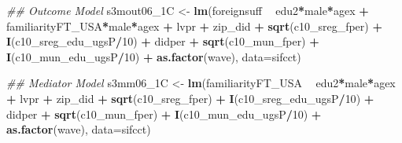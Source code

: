 \documentclass[
]{article}
\newenvironment{Shaded}{\begin{snugshade}}{\end{snugshade}}
\newcommand{\CommentTok}[1]{\textcolor[rgb]{0.56,0.35,0.01}{\textit{#1}}}
\newcommand{\DataTypeTok}[1]{\textcolor[rgb]{0.13,0.29,0.53}{#1}}
\newcommand{\DecValTok}[1]{\textcolor[rgb]{0.00,0.00,0.81}{#1}}
\newcommand{\KeywordTok}[1]{\textcolor[rgb]{0.13,0.29,0.53}{\textbf{#1}}}
\newcommand{\NormalTok}[1]{#1}
\newcommand{\OperatorTok}[1]{\textcolor[rgb]{0.81,0.36,0.00}{\textbf{#1}}}
\newcommand{\StringTok}[1]{\textcolor[rgb]{0.31,0.60,0.02}{#1}}
\begin{document}
\begin{Shaded}
\begin{Highlighting}[]
\CommentTok{## Outcome Model }
\NormalTok{s3mout06_1C <-}\StringTok{ }\KeywordTok{lm}\NormalTok{(foreignsuff  }\OperatorTok{~}\StringTok{ }\NormalTok{edu2}\OperatorTok{*}\NormalTok{male}\OperatorTok{*}\NormalTok{agex }\OperatorTok{+}\StringTok{ }\NormalTok{familiarityFT_USA}\OperatorTok{*}\NormalTok{male}\OperatorTok{*}\NormalTok{agex }\OperatorTok{+}\StringTok{ }\NormalTok{lvpr }\OperatorTok{+}\StringTok{  }
\StringTok{                    }\NormalTok{zip_did }\OperatorTok{+}\StringTok{ }\KeywordTok{sqrt}\NormalTok{(c10_sreg_fper) }\OperatorTok{+}\StringTok{ }\KeywordTok{I}\NormalTok{(c10_sreg_edu_ugsP}\OperatorTok{/}\DecValTok{10}\NormalTok{) }\OperatorTok{+}\StringTok{ }
\StringTok{                    }\NormalTok{didper }\OperatorTok{+}\StringTok{ }\KeywordTok{sqrt}\NormalTok{(c10_mun_fper) }\OperatorTok{+}\StringTok{ }\KeywordTok{I}\NormalTok{(c10_mun_edu_ugsP}\OperatorTok{/}\DecValTok{10}\NormalTok{) }\OperatorTok{+}\StringTok{ }
\StringTok{                    }\KeywordTok{as.factor}\NormalTok{(wave), }\DataTypeTok{data=}\NormalTok{sifcct)}

\CommentTok{## Mediator Model}
\NormalTok{s3mm06_1C <-}\StringTok{ }\KeywordTok{lm}\NormalTok{(familiarityFT_USA  }\OperatorTok{~}\StringTok{ }\NormalTok{edu2}\OperatorTok{*}\NormalTok{male}\OperatorTok{*}\NormalTok{agex }\OperatorTok{+}\StringTok{ }\NormalTok{lvpr }\OperatorTok{+}\StringTok{  }
\StringTok{                  }\NormalTok{zip_did }\OperatorTok{+}\StringTok{ }\KeywordTok{sqrt}\NormalTok{(c10_sreg_fper) }\OperatorTok{+}\StringTok{ }\KeywordTok{I}\NormalTok{(c10_sreg_edu_ugsP}\OperatorTok{/}\DecValTok{10}\NormalTok{) }\OperatorTok{+}\StringTok{ }
\StringTok{                  }\NormalTok{didper }\OperatorTok{+}\StringTok{ }\KeywordTok{sqrt}\NormalTok{(c10_mun_fper) }\OperatorTok{+}\StringTok{ }\KeywordTok{I}\NormalTok{(c10_mun_edu_ugsP}\OperatorTok{/}\DecValTok{10}\NormalTok{) }\OperatorTok{+}\StringTok{ }
\StringTok{                  }\KeywordTok{as.factor}\NormalTok{(wave), }\DataTypeTok{data=}\NormalTok{sifcct)}


\end{Highlighting}
\end{Shaded}
\end{document}
